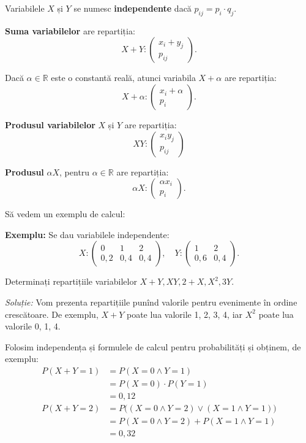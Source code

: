 \documentclass[12pt,a4paper]{article}
\newcommand\RR{\mathbb{R}}
\theoremstyle{dotless}
\theoremstyle{dotlessdr}
\begin{document}
Variabilele $ X $ și $ Y $ se numesc \textbf{independente} dacă $ p_{ij} = p_i \cdot q_j $.

\textbf{Suma variabilelor} are repartiția:
\[
  X + Y : \begin{pmatrix} x_i + y_j \\ p_{ij} \end{pmatrix}.
\]

Dacă $ \alpha \in \RR $ este o constantă reală, atunci variabila $ X + \alpha $ are repartiția:
\[
  X + \alpha : \begin{pmatrix} x_i + \alpha \\ p_i \end{pmatrix}.
\]

\textbf{Produsul variabilelor} $ X $ și $ Y $ are repartiția:
\[
  XY : \begin{pmatrix} x_iy_j \\ p_{ij} \end{pmatrix}
\]

\textbf{Produsul} $ \alpha X $, pentru $ \alpha \in \RR $ are repartiția:
\[
  \alpha X : \begin{pmatrix} \alpha x_i \\ p_i \end{pmatrix}.
\]

\vspace{1cm}

Să vedem un exemplu de calcul:

\textbf{Exemplu:} Se dau variabilele independente:
\[
  X : %
  \begin{pmatrix}
    0 & 1 & 2 \\
    0,2 & 0,4 & 0,4
  \end{pmatrix}, \quad %
  Y : %
  \begin{pmatrix}
    1 & 2 \\
    0,6 & 0,4
  \end{pmatrix}.
\]

Determinați repartițiile variabilelor $ X + Y, XY, 2 + X, X^2, 3Y $.

\emph{Soluție:} Vom prezenta repartițiile punînd valorile pentru evenimente
în ordine crescătoare. De exemplu, $ X + Y $ poate lua valorile 1, 2, 3, 4,
iar $ X^2 $ poate lua valorile 0, 1, 4.

Folosim independența și formulele de calcul pentru probabilități și obținem,
de exemplu:
\begin{align*}
  P(X + Y = 1) &= P(X = 0 \land Y = 1) \\
               &= P(X = 0) \cdot P(Y = 1) \\
               &= 0,12 \\
  P(X + Y = 2) &= P\Big((X = 0 \land Y = 2) \lor (X = 1 \land Y = 1)\Big) \\
               &= P(X = 0 \land Y = 2) + P(X = 1 \land Y = 1) \\
               &= 0,32
\end{align*}
\end{document}
